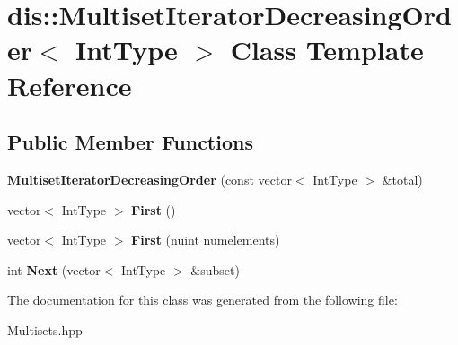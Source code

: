 \hypertarget{classdis_1_1_multiset_iterator_decreasing_order}{\section{dis\-:\-:Multiset\-Iterator\-Decreasing\-Order$<$ Int\-Type $>$ Class Template Reference}
\label{classdis_1_1_multiset_iterator_decreasing_order}
}
\subsection*{Public Member Functions}
\begin{DoxyCompactItemize}
\item 
\hypertarget{classdis_1_1_multiset_iterator_decreasing_order_a5b37c44619b86e83afa61b01f4482c48}{{\bfseries Multiset\-Iterator\-Decreasing\-Order} (const vector$<$ Int\-Type $>$ \&total)}\label{classdis_1_1_multiset_iterator_decreasing_order_a5b37c44619b86e83afa61b01f4482c48}

\item 
\hypertarget{classdis_1_1_multiset_iterator_decreasing_order_afbc0b71e9544e716198a8ce9be63faa1}{vector$<$ Int\-Type $>$ {\bfseries First} ()}\label{classdis_1_1_multiset_iterator_decreasing_order_afbc0b71e9544e716198a8ce9be63faa1}

\item 
\hypertarget{classdis_1_1_multiset_iterator_decreasing_order_a9e230be5022ab9a8e41aaf1b3fb75334}{vector$<$ Int\-Type $>$ {\bfseries First} (nuint numelements)}\label{classdis_1_1_multiset_iterator_decreasing_order_a9e230be5022ab9a8e41aaf1b3fb75334}

\item 
\hypertarget{classdis_1_1_multiset_iterator_decreasing_order_a56dd3d089876c3767be18f62988163d0}{int {\bfseries Next} (vector$<$ Int\-Type $>$ \&subset)}\label{classdis_1_1_multiset_iterator_decreasing_order_a56dd3d089876c3767be18f62988163d0}

\end{DoxyCompactItemize}


The documentation for this class was generated from the following file\-:\begin{DoxyCompactItemize}
\item 
Multisets.\-hpp\end{DoxyCompactItemize}
